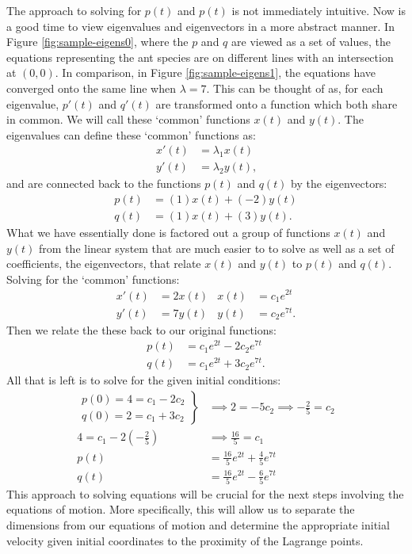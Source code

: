 The approach to solving for $p(t)$ and $p(t)$ is not immediately intuitive. Now is a good time to view eigenvalues and eigenvectors in a more abstract manner.
In Figure \ref{fig:sample-eigens0}, where the $p$ and $q$ are viewed as a set of values, the equations representing the ant species are on different lines with an intersection at $(0,0)$. 
In comparison, in Figure \ref{fig:sample-eigens1}, the equations have converged onto the same line when $\lambda = 7$.
This can be thought of as, for each eigenvalue, $p'(t)$ and $q'(t)$ are transformed onto a function which both share in common.
We will call these `common' functions $x(t)$ and $y(t)$.
The eigenvalues can define these `common' functions as:
\begin{align*}
	x'(t) &= \lambda_1 x(t) \\
	y'(t) &= \lambda_2 y(t) \text{,}
\end{align*}
and are connected back to the functions $p(t)$ and $q(t)$ by the eigenvectors:
\begin{align*}
	p(t) &= (1)x(t) + (-2)y(t) \\
	q(t) &= (1)x(t) + (3)y(t) \text{.}
\end{align*}
What we have essentially done is factored out a group of functions $x(t)$ and $y(t)$ from the linear system that are much easier to to solve as well as a set of coefficients, the eigenvectors, that relate $x(t)$ and $y(t)$ to $p(t)$ and $q(t)$.
Solving for the `common' functions:
\begin{align*}
	x'(t) &= 2x(t) & x(t) &= c_1e^{2t} \\
	y'(t) &= 7y(t) & y(t) &= c_2e^{7t} \text{.}
\end{align*}
Then we relate the these back to our original functions:
\begin{align*}
	p(t) &= c_1e^{2t} - 2c_2e^{7t} \\
	q(t) &= c_1e^{2t} + 3c_2e^{7t} \text{.}
\end{align*}
All that is left is to solve for the given initial conditions:
\begin{align*}
	\left. \begin{array}{l}
		p(0) = 4 = c_1 - 2c_2 \\
		q(0) = 2 = c_1 + 3c_2
	\end{array} \right \} &\implies 2 = -5c_2 \implies -\frac{2}{5} = c_2 \\
	4 = c_1 - 2\left(-\frac{2}{5}\right) &\implies \frac{16}{5} = c_1 \\
	p(t) &= \frac{16}{5}e^{2t} + \frac{4}{5}e^{7t} \\
	q(t) &= \frac{16}{5}e^{2t} - \frac{6}{5}e^{7t}
\end{align*}
This approach to solving equations will be crucial for the next steps involving the equations of motion.
More specifically, this will allow us to separate the dimensions from our equations of motion and determine the appropriate initial velocity given initial coordinates to the proximity of the Lagrange points.